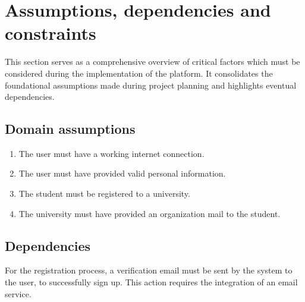 \section{Assumptions, dependencies and constraints}

This section serves as a comprehensive overview of critical factors which must be considered during the implementation of the platform.
It consolidates the foundational assumptions made during project planning and highlights eventual dependencies.

\subsection{Domain assumptions}

\begin{enumerate}[label=\textbf{D\arabic* -}]
    \item The user must have a working internet connection.
    \item The user must have provided valid personal information.
    \item The student must be registered to a university.
    \item The university must have provided an organization mail to the student.
\end{enumerate}

\subsection{Dependencies}

For the registration process, a verification email must be sent by the system to the user, to successfully
sign up.
This action requires the integration of an email service.